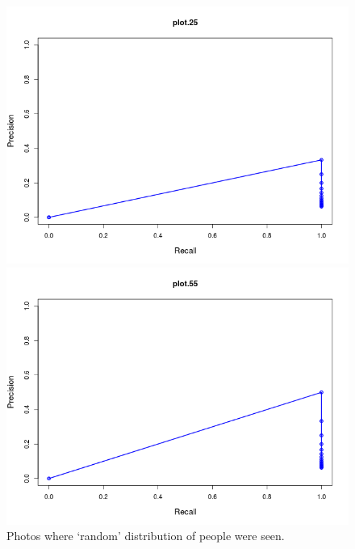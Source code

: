 \begin{figure}[t]
\begin{minipage}[b]{0.5\linewidth}
\centering
\includegraphics[width=\textwidth]{media/chapter6/pr-graphs/plot-25.png}
\end{minipage}
\hspace{0.5cm}
\begin{minipage}[b]{0.5\linewidth}
\centering
\includegraphics[width=\textwidth]{media/chapter6/pr-graphs/plot-55.png}
\end{minipage}
\caption{Photos where `random' distribution of people were seen.}
\label{fig:average}


\end{figure}
